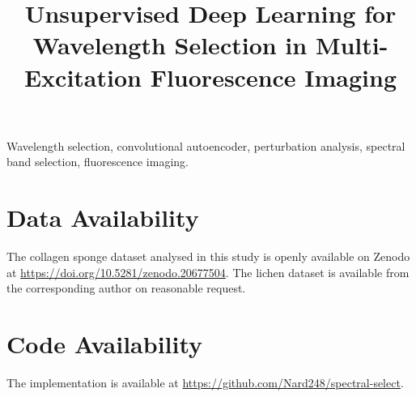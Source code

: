 \documentclass[journal]{IEEEtran}
\begin{document}
\title{Unsupervised Deep Learning for Wavelength Selection in Multi-Excitation Fluorescence Imaging}

\author{
}

\maketitle



\begin{IEEEkeywords}
Wavelength selection, convolutional autoencoder, perturbation analysis, spectral band selection, fluorescence imaging.
\end{IEEEkeywords}









\section*{Data Availability}
The collagen sponge dataset analysed in this study is openly available on Zenodo at \url{https://doi.org/10.5281/zenodo.20677504}. The lichen dataset is available from the corresponding author on reasonable request.

\section*{Code Availability}
The implementation is available at \url{https://github.com/Nard248/spectral-select}.
\end{document}
